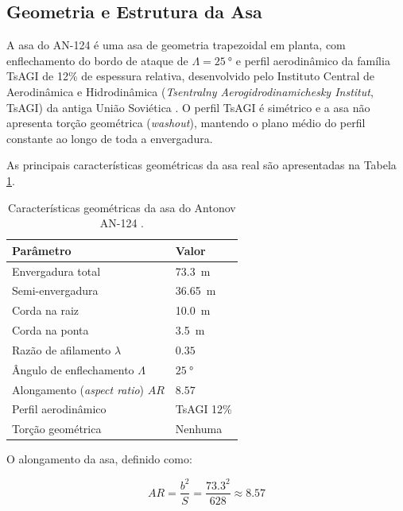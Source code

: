 \documentclass[a4paper,fleqn]{cas-sc}
\begin{document}
\subsection{Geometria e Estrutura da Asa}

A asa do AN-124 é uma asa de geometria trapezoidal em planta, com enflechamento do bordo de ataque de $\Lambda = \qty{25}{\degree}$ e perfil aerodinâmico da família TsAGI de 12\% de espessura relativa, desenvolvido pelo Instituto Central de Aerodinâmica e Hidrodinâmica (\textit{Tsentralny Aerogidrodinamichesky Institut}, TsAGI) da antiga União Soviética \cite{Gordon2008, GarciaFernandez2025}. O perfil TsAGI é simétrico e a asa não apresenta torção geométrica (\textit{washout}), mantendo o plano médio do perfil constante ao longo de toda a envergadura.

As principais características geométricas da asa real são apresentadas na Tabela \ref{tab:asa_specs}.

\begin{table}
\centering
\caption{Características geométricas da asa do Antonov AN-124 
\cite{GarciaFernandez2025, Gordon2008}.}
\label{tab:asa_specs}
\renewcommand{\arraystretch}{1.4}
\begin{tabularx}{\textwidth}{p{5.5cm} X}
\toprule
\textbf{Parâmetro} & \textbf{Valor} \\
\midrule
Envergadura total & \SI{73.3}{\meter} \\
Semi-envergadura & \SI{36.65}{\meter} \\
Corda na raiz & \SI{10.0}{\meter} \\
Corda na ponta & \SI{3.5}{\meter} \\
Razão de afilamento $\lambda$ & $0.35$ \\
Ângulo de enflechamento $\Lambda$ & $\qty{25}{\degree}$ \\
Alongamento (\textit{aspect ratio}) $AR$ & $8.57$ \\
Perfil aerodinâmico & TsAGI 12\% \\
Torção geométrica & Nenhuma \\
\bottomrule
\end{tabularx}
\end{table}

O alongamento da asa, definido como:

\begin{equation}
    AR = \frac{b^2}{S} = \frac{73.3^2}{628} \approx 8.57
    \label{eq:aspect_ratio}
\end{equation}
\end{document}
